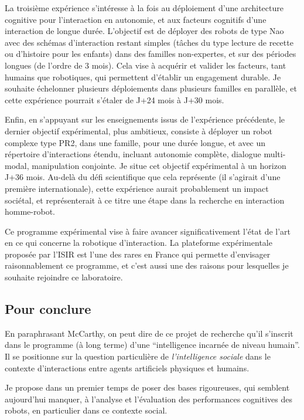 \documentclass[a4paper]{article}
\begin{document}
La troisième expérience s'intéresse à la fois au déploiement d'une architecture
cognitive pour l'interaction en autonomie, et aux facteurs cognitifs d'une
interaction de longue durée. L'objectif est de déployer des robots de type Nao avec
des schémas d'interaction restant simples (tâches du type lecture de recette ou
d'histoire pour les enfants) dans des familles non-expertes, et sur des
périodes longues (de l'ordre de 3 mois). Cela vise à acquérir et valider les
facteurs, tant humains que robotiques, qui permettent d'établir un engagement
durable.  Je souhaite échelonner plusieurs déploiements dans plusieurs familles
en parallèle, et cette expérience pourrait s'étaler de J+24 mois à J+30 mois.

Enfin, en s'appuyant sur les enseignements issus de l'expérience précédente, le
dernier objectif expérimental, plus ambitieux, consiste à déployer un robot
complexe type PR2, dans une famille, pour une durée longue, et avec un
répertoire d'interactions étendu, incluant autonomie complète, dialogue
multi-modal, manipulation conjointe. Je situe cet objectif expérimental à un
horizon J+36 mois. Au-delà du défi scientifique que cela représente (il
s'agirait d'une première internationale), cette expérience aurait probablement
un impact sociétal, et représenterait à ce titre une étape dans la recherche en
interaction homme-robot.

Ce programme expérimental vise à faire avancer significativement l'état de l'art
en ce qui concerne la robotique d'interaction. La plateforme expérimentale
proposée par l'ISIR est l'une des rares en France qui permette d'envisager
raisonnablement ce programme, et c'est aussi une des raisons pour lesquelles je
souhaite rejoindre ce laboratoire.

\subsection*{Pour conclure}

En paraphrasant McCarthy, on peut dire de ce projet de recherche qu'il s'inscrit
dans le programme (à long terme) d'une ``intelligence incarnée de niveau
humain''. Il se positionne sur la question particulière de \emph{l'intelligence
sociale} dans le contexte d'interactions entre agents artificiels physiques et
humains.

Je propose dans un premier temps de poser des bases rigoureuses, qui semblent
aujourd'hui manquer, à l'analyse et l'évaluation des performances cognitives des
robots, en particulier dans ce contexte social.
\end{document}
